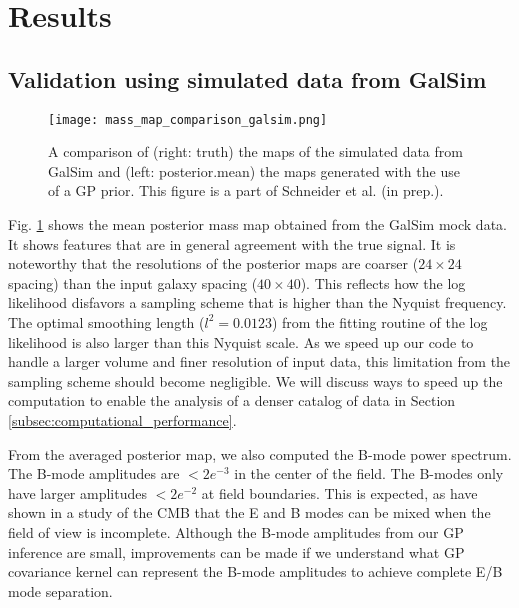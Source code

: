 \section{Results}

\subsection{Validation using simulated data from {\sc GalSim}}
\begin{figure}[!ht]
	\centering
	\texttt{[image: mass\_map\_comparison\_galsim.png]}
	\caption{A comparison of (right: truth) the maps of the simulated data from {\sc GalSim}  and
	(left: posterior.mean) the maps generated with the use of a GP prior. 
	This figure is a part of Schneider et al. (in prep.). \label{fig:Galsim_massmap}
}
\end{figure}
Fig. \ref{fig:Galsim_massmap} shows the mean posterior mass map obtained from
the {\sc GalSim} mock data. 
It shows features that are in general agreement with the true signal. 
It is noteworthy that the resolutions of the posterior maps are coarser ($24 \times 24$
spacing) than the input galaxy
spacing ($40 \times 40$). This reflects how the log likelihood
disfavors a sampling
scheme that is higher than the Nyquist frequency. The optimal smoothing length
($l^2 = 0.0123$) from the fitting routine of the log likelihood is also
larger than this Nyquist scale. As we speed up our code to handle a larger
volume and finer
resolution of input data, this limitation from the sampling scheme should
become negligible. We will discuss ways to speed up the computation to enable
the analysis of a denser catalog of data in Section
\ref{subsec:computational_performance}. 

From the averaged posterior map, we also computed the B-mode power spectrum.
The B-mode amplitudes are $< 2e^{-3}$ in the center of the field. 
The B-modes only have larger amplitudes $< 2e^{-2}$ at field boundaries.  
This is expected, as \cite{Bunn2003} have shown in a study of the CMB that 
the E and B modes can be mixed when the field of view is incomplete.
Although the B-mode amplitudes from our GP inference are small, 
improvements can be made 
if we understand what GP covariance kernel can represent the B-mode amplitudes to achieve complete E/B mode
separation.

